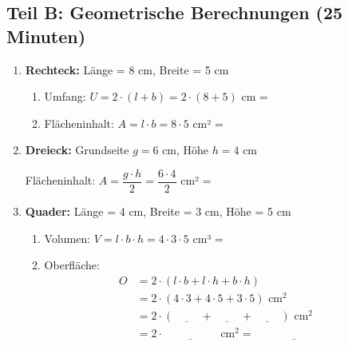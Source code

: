 \subsection*{Teil B: Geometrische Berechnungen (25 Minuten)}

\begin{enumerate}[resume, label=\arabic*.]
    \item \textbf{Rechteck:} Länge = 8 cm, Breite = 5 cm

    \begin{enumerate}[label=\alph*)]
        \item Umfang: $U = 2 \cdot (l + b) = 2 \cdot (8 + 5)$ cm = \underline{\hspace{3cm}}
        \item Flächeninhalt: $A = l \cdot b = 8 \cdot 5$ cm² = \underline{\hspace{3cm}}
    \end{enumerate}

    \vspace{0.5cm}

    \item \textbf{Dreieck:} Grundseite $g = 6$ cm, Höhe $h = 4$ cm

    Flächeninhalt: $A = \dfrac{g \cdot h}{2} = \dfrac{6 \cdot 4}{2}$ cm² = \underline{\hspace{3cm}}

    \vspace{0.5cm}

    \item \textbf{Quader:} Länge = 4 cm, Breite = 3 cm, Höhe = 5 cm

    \begin{enumerate}[label=\alph*)]
        \item Volumen: $V = l \cdot b \cdot h = 4 \cdot 3 \cdot 5$ cm³ = \underline{\hspace{3cm}}

        \item Oberfläche: 
        \begin{align*}
            O &= 2 \cdot (l \cdot b + l \cdot h + b \cdot h)\\
            &= 2 \cdot (4 \cdot 3 + 4 \cdot 5 + 3 \cdot 5) \text{ cm}^2\\
            &= 2 \cdot (\underline{\hspace{1cm}} + \underline{\hspace{1cm}} + \underline{\hspace{1cm}}) \text{ cm}^2\\
            &= 2 \cdot \underline{\hspace{2cm}} \text{ cm}^2 = \underline{\hspace{3cm}}
        \end{align*}
    \end{enumerate}


\end{enumerate}
